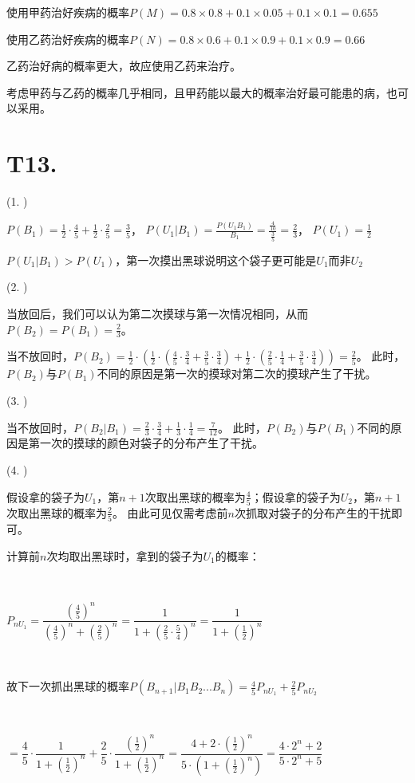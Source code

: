 \documentclass{article}
\begin{document}
使用甲药治好疾病的概率$P(M)=0.8\times0.8+0.1\times0.05+0.1\times0.1=0.655$

使用乙药治好疾病的概率$P(N)=0.8\times0.6+0.1\times0.9+0.1\times0.9=0.66$

乙药治好病的概率更大，故应使用乙药来治疗。

考虑甲药与乙药的概率几乎相同，且甲药能以最大的概率治好最可能患的病，也可以采用。

\section*{T13. }

(1. )

$P(B_1)=\frac{1}{2}\cdot\frac{4}{5}+\frac{1}{2}\cdot\frac{2}{5}=\frac{3}{5}$，
$P(U_1|B_1)=\frac{P(U_1B_1)}{B_1}=\frac{\frac{4}{10}}{\frac{3}{5}}=\frac{2}{3}$，
$P(U_1)=\frac{1}{2}$

$P(U_1|B_1)>P(U_1)$，第一次摸出黑球说明这个袋子更可能是$U_1$而非$U_2$

(2. )

当放回后，我们可以认为第二次摸球与第一次情况相同，从而$P(B_2)=P(B_1)=\frac{2}{3}$。

当不放回时，$P(B_2)=\frac{1}{2}\cdot (\frac{1}{2}\cdot (\frac{4}{5}\cdot\frac{3}{4}+\frac{3}{5}\cdot\frac{3}{4}) + \frac{1}{2}\cdot (\frac{2}{5}\cdot\frac{1}{4}+\frac{3}{5}\cdot\frac{3}{4}))=\frac{2}{5}$。
此时，$P(B_2)$与$P(B_1)$不同的原因是第一次的摸球对第二次的摸球产生了干扰。

(3. )

当不放回时，$P(B_2|B_1)=\frac{2}{3}\cdot\frac{3}{4}+\frac{1}{3}\cdot\frac{1}{4}=\frac{7}{12}$。
此时，$P(B_2)$与$P(B_1)$不同的原因是第一次的摸球的颜色对袋子的分布产生了干扰。

(4. )

假设拿的袋子为$U_1$，第$n+1$次取出黑球的概率为$\frac{4}{5}$；假设拿的袋子为$U_2$，第$n+1$次取出黑球的概率为$\frac{2}{5}$。
由此可见仅需考虑前$n$次抓取对袋子的分布产生的干扰即可。

计算前$n$次均取出黑球时，拿到的袋子为$U_1$的概率：

~

$P_{nU_1}=\dfrac{(\frac{4}{5})^n}{(\frac{4}{5})^n+(\frac{2}{5})^n}=\dfrac{1}{1+(\frac{2}{5}\cdot\frac{5}{4})^n}=\dfrac{1}{1+(\frac{1}{2})^n}$

~

故下一次抓出黑球的概率$P(B_{n+1}|B_1B_2...B_n)=\frac{4}{5}P_{nU_1}+\frac{2}{5}P_{nU_2}$

~

$=\dfrac{4}{5}\cdot\dfrac{1}{1+(\frac{1}{2})^n}+\dfrac{2}{5}\cdot\dfrac{(\frac{1}{2})^n}{1+(\frac{1}{2})^n}
=\dfrac{4+2\cdot(\frac{1}{2})^n}{5\cdot(1+(\frac{1}{2})^n)}=\dfrac{4\cdot 2^n+2}{5\cdot 2^n+5}$
\end{document}
